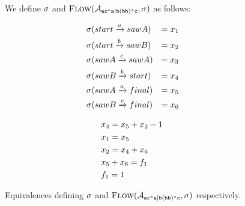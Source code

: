 \documentclass[acmsmall,review,anonymous,screen]{acmart}\settopmatter{printfolios=true,printccs=false,printacmref=true}
\theoremstyle{definition}
\begin{document}
\begin{figure}[ht]
  We define $\operatorname{\sigma}$ and $\textsc{Flow}(\mathcal{A}_{\mathtt{ac^*a|b(bb)^*c}}{}, \operatorname{\sigma})$ as follows:

  \begin{minipage}[b]{0.45\linewidth}
    \begin{equation*}
      \begin{aligned}
        & \operatorname{\sigma}(start \xrightarrow{a} sawA) & = x_1 \\
        & \operatorname{\sigma}(start \xrightarrow{b} sawB) & = x_2 \\
        & \operatorname{\sigma}(sawA \xrightarrow{c} sawA)  & = x_3  \\
        & \operatorname{\sigma}(sawB \xrightarrow{b} start) & = x_4 \\
        & \operatorname{\sigma}(sawA \xrightarrow{a} final) & = x_5 \\
        & \operatorname{\sigma}(sawB \xrightarrow{c} final) & = x_6 \\
      \end{aligned}
    \end{equation*}    
  \end{minipage}
  \hspace{0.5cm}
  \begin{minipage}[b]{0.45\linewidth}
    \begin{equation*}
      \begin{aligned}
        &  x_4 = x_5 + x_2 - 1 \\
        & x_1 = x_5 \\
        & x_2 = x_4 + x_6 \\
        & x_5 + x_6 = f_1 \\
        & f_1 = 1 \\
      \end{aligned}  
    \end{equation*}    
  \end{minipage}
  \caption{Equivalences defining $\operatorname{\sigma}$ and $\textsc{Flow}(\mathcal{A}_{\mathtt{ac^*a|b(bb)^*c}}{}, \operatorname{\sigma})$
  respectively.}\label{fig:example:single:equivalences}
  \end{figure}
\end{document}
